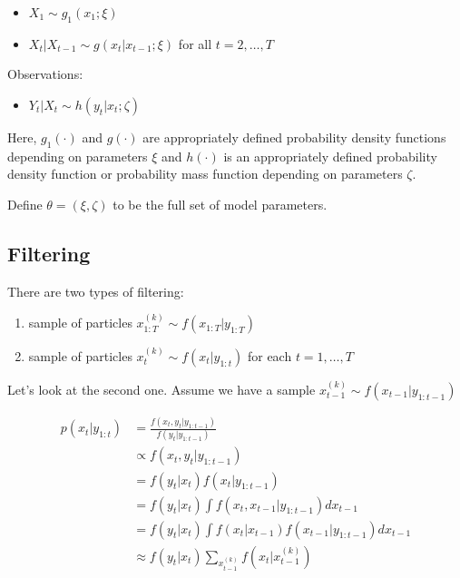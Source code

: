 \documentclass[]{article}
\providecommand{\tightlist}{%
  \setlength{\itemsep}{0pt}\setlength{\parskip}{0pt}}
\begin{document}
\begin{itemize}
\item $X_1 \sim g_1(x_1 ; \xi)$
\item $X_t \vert X_{t-1} \sim g(x_t \vert x_{t - 1} ; \xi)$ for all $t = 2, \ldots, T$
\end{itemize}

Observations:

\begin{itemize}
\item $Y_t \vert X_{t} \sim h(y_t | x_t ; \zeta)$
\end{itemize}

Here, \(g_1(\cdot)\) and \(g(\cdot)\) are appropriately defined
probability density functions depending on parameters \(\xi\) and
\(h(\cdot)\) is an appropriately defined probability density function or
probability mass function depending on parameters \(\zeta\).

Define \(\theta = (\xi, \zeta)\) to be the full set of model parameters.

\subsection{Filtering}\label{filtering}

There are two types of filtering:

\begin{enumerate}
\def\labelenumi{\arabic{enumi}.}
\tightlist
\item
  sample of particles \(x_{1:T}^{(k)} \sim f(x_{1:T} | y_{1:T})\)
\item
  sample of particles \(x_{t}^{(k)} \sim f(x_{t} | y_{1:t})\) for each
  \(t = 1, \ldots, T\)
\end{enumerate}

Let's look at the second one. Assume we have a sample
\(x_{t-1}^{(k)} \sim f(x_{t-1} | y_{1:t-1})\)

\begin{align*}
p(x_{t} | y_{1:t}) &= \frac{f(x_t, y_t | y_{1:t-1})}{f(y_t | y_{1:t-1})} \\
 &\propto f(x_t, y_t | y_{1:t-1}) \\
 &= f(y_t | x_t) f(x_t | y_{1:t-1}) \\
 &= f(y_t | x_t) \int f(x_t, x_{t-1} | y_{1:t-1}) d x_{t-1} \\
 &= f(y_t | x_t) \int f(x_t | x_{t - 1}) f(x_{t-1} | y_{1:{t-1}}) dx_{t-1} \\
 &\approx f(y_t | x_t) \sum_{x_{t-1}^{(k)}} f(x_t | x_{t - 1}^{(k)})
\end{align*}
\end{document}
